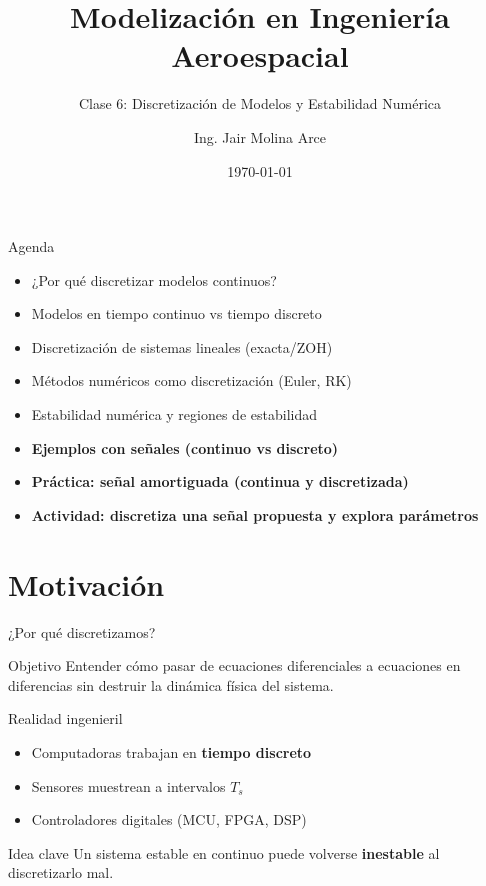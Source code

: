 \documentclass[aspectratio=169,10pt]{beamer}
\title[Modelización Aeroespacial]{Modelización en Ingeniería Aeroespacial}
\subtitle{Clase 6: Discretización de Modelos y Estabilidad Numérica}
\author[Ing. Jair Molina]{Ing. Jair Molina Arce}
\institute[UNII]{Universidad Internacional de Innovación}
\date{\today}
\newcommand{\importantbox}[2][Importante]{%
\begin{alertblock}{#1}#2\end{alertblock}}
\newcommand{\objectivebox}[1]{%
\begin{block}{Objetivo}#1\end{block}}
\begin{document}
\begin{frame}
\titlepage
\end{frame}

\begin{frame}{Agenda}
\small
\begin{itemize}
\item ¿Por qué discretizar modelos continuos?
\item Modelos en tiempo continuo vs tiempo discreto
\item Discretización de sistemas lineales (exacta/ZOH)
\item Métodos numéricos como discretización (Euler, RK)
\item Estabilidad numérica y regiones de estabilidad
\item \textbf{Ejemplos con señales (continuo vs discreto)}
\item \textbf{Práctica: señal amortiguada (continua y discretizada)}
\item \textbf{Actividad: discretiza una señal propuesta y explora parámetros}
\end{itemize}
\end{frame}

\section{Motivación}

\begin{frame}{¿Por qué discretizamos?}
\small

\objectivebox{
Entender cómo pasar de ecuaciones diferenciales a ecuaciones en diferencias
sin destruir la dinámica física del sistema.
}

\begin{block}{Realidad ingenieril}
\begin{itemize}
\item Computadoras trabajan en \textbf{tiempo discreto}
\item Sensores muestrean a intervalos $T_s$
\item Controladores digitales (MCU, FPGA, DSP)
\end{itemize}
\end{block}

\importantbox[Idea clave]{
Un sistema estable en continuo puede volverse \textbf{inestable} al discretizarlo mal.
}
\end{frame}
\end{document}
